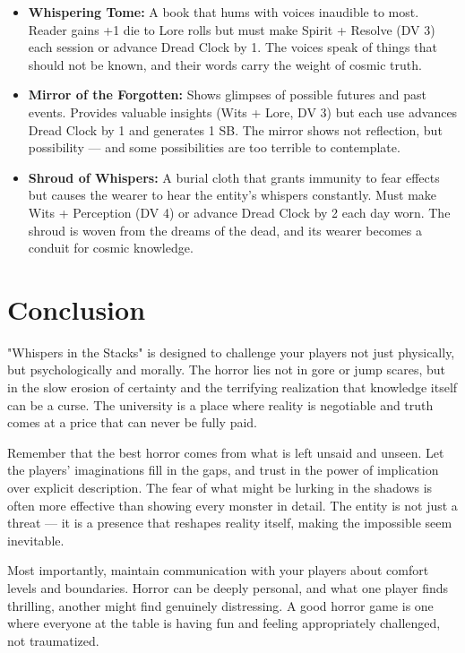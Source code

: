 \documentclass[11pt]{article}
\begin{document}
\begin{itemize}
\item \textbf{Whispering Tome:} A book that hums with voices inaudible to most. Reader gains +1 die to Lore rolls but must make Spirit + Resolve (DV 3) each session or advance Dread Clock by 1. The voices speak of things that should not be known, and their words carry the weight of cosmic truth.
\item \textbf{Mirror of the Forgotten:} Shows glimpses of possible futures and past events. Provides valuable insights (Wits + Lore, DV 3) but each use advances Dread Clock by 1 and generates 1 SB. The mirror shows not reflection, but possibility — and some possibilities are too terrible to contemplate.
\item \textbf{Shroud of Whispers:} A burial cloth that grants immunity to fear effects but causes the wearer to hear the entity's whispers constantly. Must make Wits + Perception (DV 4) or advance Dread Clock by 2 each day worn. The shroud is woven from the dreams of the dead, and its wearer becomes a conduit for cosmic knowledge.
\end{itemize}

\section{Conclusion}

"Whispers in the Stacks" is designed to challenge your players not just physically, but psychologically and morally. The horror lies not in gore or jump scares, but in the slow erosion of certainty and the terrifying realization that knowledge itself can be a curse. The university is a place where reality is negotiable and truth comes at a price that can never be fully paid.

Remember that the best horror comes from what is left unsaid and unseen. Let the players' imaginations fill in the gaps, and trust in the power of implication over explicit description. The fear of what might be lurking in the shadows is often more effective than showing every monster in detail. The entity is not just a threat — it is a presence that reshapes reality itself, making the impossible seem inevitable.

Most importantly, maintain communication with your players about comfort levels and boundaries. Horror can be deeply personal, and what one player finds thrilling, another might find genuinely distressing. A good horror game is one where everyone at the table is having fun and feeling appropriately challenged, not traumatized.
\end{document}
